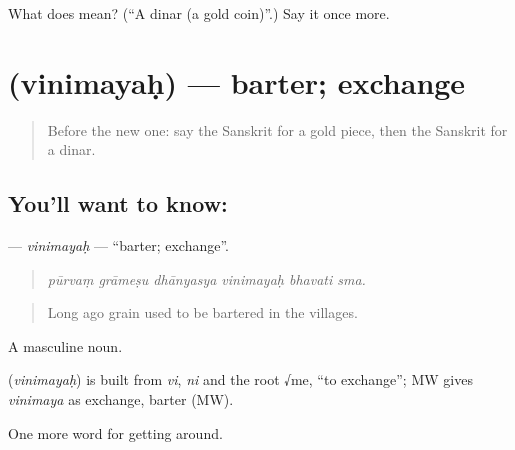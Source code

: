\begin{tcolorbox}[breakable,colback=teal!4,colframe=teal!35!black,title={Before you move on}]
What does  mean? (\textquotedblleft{}A dinar (a gold coin)\textquotedblright{}.) Say it once more.
\end{tcolorbox}
\section[\texorpdfstring{\sk{विनिमयः} (vinimayaḥ)}{विनिमयः (vinimayaḥ)}]{ (vinimayaḥ) — barter; exchange}

\label{lesson:SA-C435-vinimayah}



\begin{quote}
Before the new one: say the Sanskrit for a gold piece, then the Sanskrit for a dinar.
\end{quote}

\subsection*{You'll want to know: }
\textbf{} — \emph{vinimayaḥ} — \textquotedblleft{}barter; exchange\textquotedblright{}.

\begin{quote}
     
\end{quote}

\begin{quote}
\emph{pūrvaṃ grāmeṣu dhānyasya vinimayaḥ bhavati sma.}
\end{quote}

\begin{quote}
Long ago grain used to be bartered in the villages.
\end{quote}

A masculine noun.

\begin{cousinweb}
\textbf{} (\emph{vinimayaḥ}) is built from \emph{vi}, \emph{ni} and the root √me, \textquotedblleft{}to exchange\textquotedblright{}; MW gives \emph{vinimaya} as exchange, barter (MW).
\end{cousinweb}

\begin{grammarlens}[title={What you've built}]
One more word for getting around.
\end{grammarlens}

